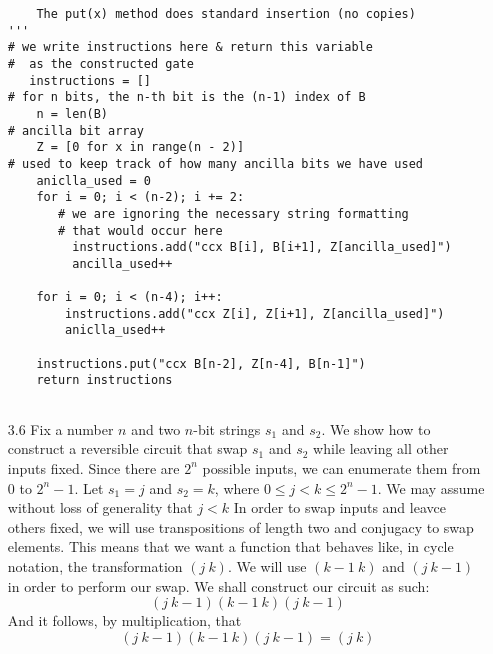 \documentclass[11pt]{article}
\begin{document}
\begin{enumerate}
\begin{lstlisting}
    The put(x) method does standard insertion (no copies)
'''
# we write instructions here & return this variable
#  as the constructed gate
   instructions = []
# for n bits, the n-th bit is the (n-1) index of B
    n = len(B)
# ancilla bit array
    Z = [0 for x in range(n - 2)] 
# used to keep track of how many ancilla bits we have used
    aniclla_used = 0  
    for i = 0; i < (n-2); i += 2:
       # we are ignoring the necessary string formatting
       # that would occur here
         instructions.add("ccx B[i], B[i+1], Z[ancilla_used]")
         ancilla_used++

    for i = 0; i < (n-4); i++:
        instructions.add("ccx Z[i], Z[i+1], Z[ancilla_used]")
        aniclla_used++

    instructions.put("ccx B[n-2], Z[n-4], B[n-1]")  
    return instructions
        
    \end{lstlisting}

  
\item[3.6]
  Fix a number $n$ and two $n$-bit strings $s_1$ and $s_2$.
  We show how to construct a reversible circuit that swap $s_1$ and $s_2$ while leaving all other inputs fixed.
  Since there are $2^n$ possible inputs, we can enumerate them from $0$ to $2^n-1$. Let $s_1 = j$ and $s_2 = k$, where $0 \leq j < k \leq 2^n-1$.
  We may assume without loss of generality that $j < k$
  In order to swap inputs and leavce others fixed, we will use transpositions of length two and conjugacy to swap elements.
  This means that we want a function that behaves like, in cycle notation,
  the transformation $(j \ k)$.
  We will use $(k-1 \ k)$ and $(j \ k-1)$ in order to perform our swap.
  We shall construct our circuit as such:
  \[ (j \ k-1) (k-1 \  k) (j \  k-1)  \]
  And it follows, by multiplication, that 
  \[ (j \ k-1) (k-1 \ k) (j \ k-1) = (j \ k) \]


\end{enumerate}
\end{document}
